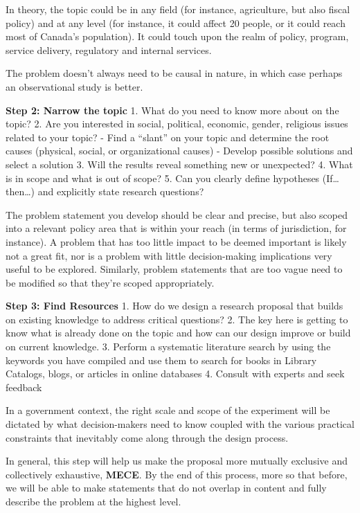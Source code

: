 \documentclass[]{book}
\begin{document}
In theory, the topic could be in any field (for instance, agriculture, but also fiscal policy) and at any level (for instance, it could affect 20 people, or it could reach most of Canada's population). It could touch upon the realm of policy, program, service delivery, regulatory and internal services.

The problem doesn't always need to be causal in nature, in which case perhaps an observational study is better.

\textbf{Step 2: Narrow the topic}
1. What do you need to know more about on the topic?
2. Are you interested in social, political, economic, gender, religious issues related to your topic?
- Find a ``slant'' on your topic and determine the root causes (physical, social, or organizational causes)
- Develop possible solutions and select a solution
3. Will the results reveal something new or unexpected?
4. What is in scope and what is out of scope?
5. Can you clearly define hypotheses (If\ldots{}then\ldots{}) and explicitly state research questions?

The problem statement you develop should be clear and precise, but also scoped into a relevant policy area that is within your reach (in terms of jurisdiction, for instance). A problem that has too little impact to be deemed important is likely not a great fit, nor is a problem with little decision-making implications very useful to be explored. Similarly, problem statements that are too vague need to be modified so that they're scoped appropriately.

\textbf{Step 3: Find Resources}
1. How do we design a research proposal that builds on existing knowledge to address critical questions?
2. The key here is getting to know what is already done on the topic and how can our design improve or build on current knowledge.
3. Perform a systematic literature search by using the keywords you have compiled and use them to search for books in Library Catalogs, blogs, or articles in online databases
4. Consult with experts and seek feedback

In a government context, the right scale and scope of the experiment will be dictated by what decision-makers need to know coupled with the various practical constraints that inevitably come along through the design process.

In general, this step will help us make the proposal more mutually exclusive and collectively exhaustive, \textbf{MECE}. By the end of this process, more so that before, we will be able to make statements that do not overlap in content and fully describe the problem at the highest level.
\end{document}
